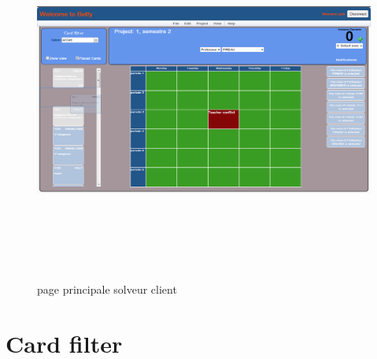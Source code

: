 \begin{figure}[!h]
	\begin{center}
		\includegraphics[width=19cm,height=12cm,angle=90]{MainPageColorTab.png}
		\caption{page principale solveur client}
	\end{center}
\end{figure}

\newpage

\section{Card filter}
\label{annexe/espace_nom}

